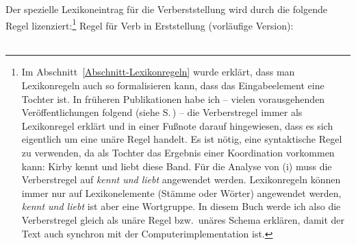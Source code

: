 Der spezielle Lexikoneintrag für die Verberststellung wird durch die folgende
Regel lizenziert:\footnote{\label{fn-V1-Lexikonregel-oder-Schema}%
Im Abschnitt~\ref{Abschnitt-Lexikonregeln} wurde erklärt, dass man Lexikonregeln auch so formalisieren
kann, dass das Eingabeelement eine Tochter ist. In früheren Publikationen habe ich -- vielen
vorausgehenden Veröffentlichungen folgend (siehe S.\,\pageref{Seite-V1-via-Lexikonregel}) -- die
Verberstregel immer als Lexikonregel erklärt und in einer Fußnote darauf hingewiesen, dass es sich
eigentlich um eine unäre Regel handelt. Es ist nötig, eine syntaktische Regel zu verwenden, da als
Tochter das Ergebnis einer Koordination vorkommen kann:
\ea
Kirby kennt und liebt diese Band.
\z
Für die Analyse von (i) muss die Verberstregel auf \emph{kennt und liebt} angewendet
werden. Lexikonregeln können immer nur auf Lexikonelemente (Stämme oder Wörter) angewendet werden,
\emph{kennt und liebt} ist aber eine Wortgruppe. In diesem Buch werde ich also die Verberstregel
gleich als unäre Regel bzw.\ unäres Schema erklären, damit der Text auch synchron mit der
Computerimplementation ist. 
}
\eas
\label{lr-verb-movement}%
Regel für Verb in Erststellung (vorläufige Version):\\
 \impl\\
\zs

